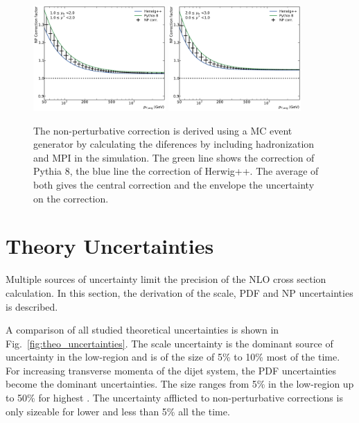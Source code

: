 \begin{figure}[htp]
    \includegraphics[width=0.45\textwidth]{figures/theory/np_factors_calc_yb1ys1.pdf}\hfill
    \includegraphics[width=0.45\textwidth]{figures/theory/np_factors_calc_yb2ys0.pdf}
    \caption{The non-perturbative correction is derived using a MC event
        generator by calculating the diferences by including hadronization and
        MPI in the simulation. The green line shows the correction of Pythia 8,
        the blue line the correction of Herwig++. The average of both gives the
        central correction and the envelope the uncertainty on the correction.}
    \label{fig:np_factors}
\end{figure}

\section{Theory Uncertainties}

Multiple sources of uncertainty limit the precision of the NLO cross section
calculation. In this section, the derivation of the scale, PDF and NP
uncertainties is described. 

A comparison of all studied theoretical uncertainties is shown in
Fig.~\ref{fig:theo_uncertainties}. The scale uncertainty is the dominant source
of uncertainty in the low-\pt region and is of the size of 5\% to 10\% most of
the time. For increasing transverse momenta of the dijet system, the PDF
uncertainties become the dominant uncertainties. The size ranges from 5\% in the
low-\pt region up to 50\% for highest \pt. The uncertainty afflicted to
non-perturbative corrections is only sizeable for lower \pt and less than 5\%
all the time.

